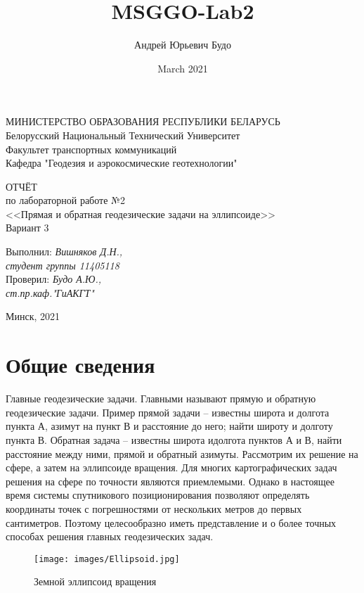 \documentclass[a4paper,14pt]{article}
\title{MSGGO-Lab2}
\author{Андрей Юрьевич Будо }
\date{March 2021}
\newcommand\indent[1][1cm]{\hspace*{#1}}
\begin{document}
    
    \thispagestyle{empty}
    \begin{center}
        МИНИСТЕРСТВО ОБРАЗОВАНИЯ РЕСПУБЛИКИ БЕЛАРУСЬ\\
        Белорусский Национальный Технический Университет\\
        Факультет транспортных коммуникаций\\
        Кафедра "Геодезия и аэрокосмические геотехнологии"
    \end{center}
    \begin{center}
        \vspace{13ex}
        ОТЧЁТ\\
        по лабораторной работе №2\\
        <<Прямая и обратная геодезические задачи на эллипсоиде>>\\
        Вариант 3
    \end{center}
    \begin{flushright}
        \vspace{13ex}
        Выполнил: \textit{Вишняков Д.Н.,\\
        студент группы 11405118}\\
        \vspace{5ex}
        Проверил: \textit{Будо А.Ю.,\\
        ст.пр.каф."ГиАКГТ"}\\
    \end{flushright}
    \begin{center}
        \vfill
        Минск, 2021
    \end{center}

\newpage
\section{Общие сведения}
\indent Главные геодезические задачи. Главными называют прямую и обратную геодезические
задачи. Пример прямой задачи – известны широта и долгота пункта А, азимут на пункт В и
расстояние до него; найти широту и долготу пункта В. Обратная задача – известны широта идолгота пунктов А и В, найти расстояние между ними, прямой и обратный азимуты. Рассмотрим их решение на сфере, а затем на эллипсоиде вращения. Для многих картографических задач решения на сфере по точности являются приемлемыми. Однако в настоящее время системы спутникового позиционирования позволяют определять координаты точек с погрешностями от нескольких метров до первых сантиметров. Поэтому целесообразно иметь представление и о более точных способах решения главных геодезических задач.\\
\begin{figure}[h]
    \centering
    \hypertarget{table1}{\texttt{[image: images/Ellipsoid.jpg]}}
    \caption{Земной эллипсоид вращения}
    \label{fig:my_label}
\end{figure}
\end{document}
